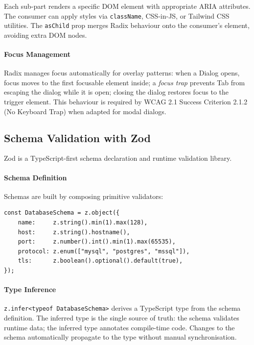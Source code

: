 Each sub-part renders a specific DOM element with appropriate ARIA attributes. The consumer can apply styles via \texttt{className}, CSS-in-JS, or Tailwind CSS utilities. The \texttt{asChild} prop merges Radix behaviour onto the consumer's element, avoiding extra DOM nodes.

\paragraph{Focus Management}

Radix manages focus automatically for overlay patterns: when a Dialog opens, focus moves to the first focusable element inside; a \emph{focus trap} prevents Tab from escaping the dialog while it is open; closing the dialog restores focus to the trigger element. This behaviour is required by WCAG 2.1 Success Criterion 2.1.2 (No Keyboard Trap) when adapted for modal dialogs.

\subsection{Schema Validation with Zod}

Zod is a TypeScript-first schema declaration and runtime validation library.

\paragraph{Schema Definition}

Schemas are built by composing primitive validators:
\begin{verbatim}
const DatabaseSchema = z.object({
    name:     z.string().min(1).max(128),
    host:     z.string().hostname(),
    port:     z.number().int().min(1).max(65535),
    protocol: z.enum(["mysql", "postgres", "mssql"]),
    tls:      z.boolean().optional().default(true),
});
\end{verbatim}

\paragraph{Type Inference}

\texttt{z.infer<typeof DatabaseSchema>} derives a TypeScript type from the schema definition. The inferred type is the single source of truth: the schema validates runtime data; the inferred type annotates compile-time code. Changes to the schema automatically propagate to the type without manual synchronisation.

